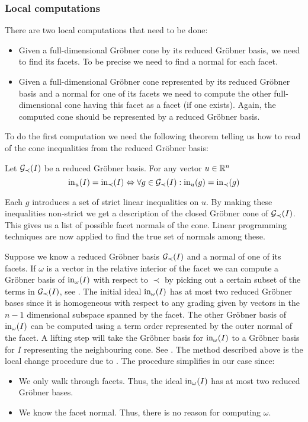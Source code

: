 \subsubsection{Local computations}
There are two local computations that need to be done:
\begin{itemize}
\item Given a full-dimensional Gr\"obner cone by its reduced Gr\"obner basis, we need to find its facets. To be precise we need to find a normal for each facet.
\item Given a full-dimensional Gr\"obner cone represented by its reduced Gr\"obner basis and a normal for one of its facets we need to compute the other full-dimensional cone having this facet as a facet (if one exists). Again, the computed cone should be represented by a reduced Gr\"obner basis.
\end{itemize}
To do the first computation we need the following theorem telling us how to read of the cone inequalities from the reduced Gr\"obner basis:
\begin{theorem}
Let $\mathcal{G}_\prec(I)$ be a reduced Gr\"obner basis. For any vector $u\in\mathbb{R}^n$
$$\textup{in}_u(I)=\textup{in}_\prec(I) \Leftrightarrow \forall g\in\mathcal{G}_\prec(I):\textup{in}_u(g)=\textup{in}_\prec(g)$$
\end{theorem}
Each $g$ introduces a set of strict linear inequalities on $u$.
By making these inequalities non-strict we get a description of the closed Gr\"obner cone of $\mathcal{G}_\prec(I)$.
This gives us a list of possible facet normals of the cone. Linear programming techniques are now applied to find the true set of normals among these.

Suppose we know a reduced Gr\"obner basis $\mathcal{G}_\prec(I)$ and a normal of one of its facets. If $\omega$ is a vector in the relative interior of the facet we can compute a Gr\"obner basis of $\textup{in}_\omega(I)$ with respect to $\prec$ by picking out a certain subset of the terms in $\mathcal{G}_\prec(I)$, see \cite[Corollary 1.9]{sturmfels}. The initial ideal $\textup{in}_\omega(I)$ has at most two reduced Gr\"obner bases since it is homogeneous with respect to any grading given by vectors in the $n-1$ dimensional subspace spanned by the facet. The other Gr\"obner basis of $\textup{in}_\omega(I)$ can be computed using a term order represented by the outer normal of the facet. A lifting step will take the Gr\"obner basis for $\textup{in}_\omega(I)$ to a Gr\"obner basis for $I$ representing the neighbouring cone. See \cite[Subroutine 3.7]{sturmfels}. The method described above is the local change procedure due to \cite{collart}. The procedure simplifies in our case since:
\begin{itemize}
\item We only walk through facets. Thus, the ideal $\textup{in}_\omega(I)$ has at most two reduced Gr\"obner bases.
\item We know the facet normal. Thus, there is no reason for computing $\omega$.
\end{itemize}
